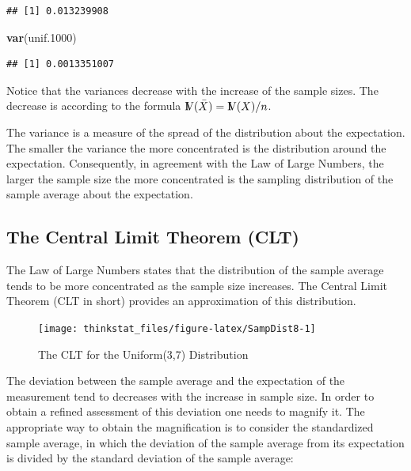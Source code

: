 \documentclass[]{krantz}
\makeatletter
\newenvironment{Shaded}{\begin{snugshade}}{\end{snugshade}}
\newcommand{\KeywordTok}[1]{\textcolor[rgb]{0.13,0.29,0.53}{\textbf{#1}}}
\newcommand{\DecValTok}[1]{\textcolor[rgb]{0.00,0.00,0.81}{#1}}
\newcommand{\NormalTok}[1]{#1}
\newcommand{\Var}{{\rm I\kern-.3em V}}
\newenvironment{kframe}{%
\medskip{}
\setlength{\fboxsep}{.8em}
 \def\at@end@of@kframe{}%
 \ifinner\ifhmode%
  \def\at@end@of@kframe{\end{minipage}}%
  \begin{minipage}{\columnwidth}%
 \fi\fi%
 \def\FrameCommand##1{\hskip\@totalleftmargin \hskip-\fboxsep
 \colorbox{shadecolor}{##1}\hskip-\fboxsep
     \hskip-\linewidth \hskip-\@totalleftmargin \hskip\columnwidth}%
 \MakeFramed {\advance\hsize-\width
   \@totalleftmargin\z@ \linewidth\hsize
   \@setminipage}}%
 {\par\unskip\endMakeFramed%
 \at@end@of@kframe}
\renewenvironment{Shaded}{\begin{kframe}}{\end{kframe}}
\theoremstyle{definition}
\theoremstyle{definition}
\theoremstyle{definition}
\theoremstyle{remark}
\makeatother
\begin{document}
\begin{verbatim}
## [1] 0.013239908
\end{verbatim}

\begin{Shaded}
\begin{Highlighting}[]
\KeywordTok{var}\NormalTok{(unif.}\DecValTok{1000}\NormalTok{)}
\end{Highlighting}
\end{Shaded}

\begin{verbatim}
## [1] 0.0013351007
\end{verbatim}

Notice that the variances decrease with the increase of the sample
sizes. The decrease is according to the formula
\(\Var(\bar X) = \Var(X)/n\).

The variance is a measure of the spread of the distribution about the
expectation. The smaller the variance the more concentrated is the
distribution around the expectation. Consequently, in agreement with the
Law of Large Numbers, the larger the sample size the more concentrated
is the sampling distribution of the sample average about the
expectation.

\subsection{The Central Limit Theorem
(CLT)}\label{the-central-limit-theorem-clt}

The Law of Large Numbers states that the distribution of the sample
average tends to be more concentrated as the sample size increases. The
Central Limit Theorem (CLT in short) provides an approximation of this
distribution.

\begin{figure}

{\centering \texttt{[image: thinkstat\_files/figure-latex/SampDist8-1]} 

}

\caption{The CLT for the Uniform(3,7) Distribution}\label{fig:SampDist8}
\end{figure}

The deviation between the sample average and the expectation of the
measurement tend to decreases with the increase in sample size. In order
to obtain a refined assessment of this deviation one needs to magnify
it. The appropriate way to obtain the magnification is to consider the
standardized sample average, in which the deviation of the sample
average from its expectation is divided by the standard deviation of the
sample average:
\end{document}
